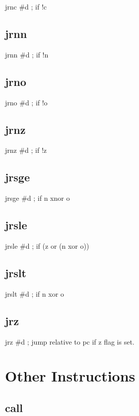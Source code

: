 \documentclass{book}
\begin{document}
jrnc \#d               ; if !c


\subsection{jrnn}

jrnn \#d               ; if !n


\subsection{jrno}

jrno \#d               ; if !o


\subsection{jrnz}

jrnz \#d               ; if !z


\subsection{jrsge}

jrsge \#d              ; if n xnor o


\subsection{jrsle}

jrsle \#d              ; if (z or (n xor o))


\subsection{jrslt}

jrslt \#d              ; if n xor o



\subsection{jrz}

jrz \#d                ; jump relative to pc if z flag is set.


\section{Other Instructions}

\subsection{call}
\end{document}
